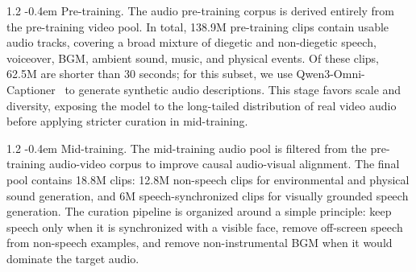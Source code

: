 \documentclass{llmxive}
\makeatletter
\providecommand{\paragraph}{  \@startsection{paragraph}{4}{\z@}    {1\baselineskip \@plus .2\baselineskip}    {-0.4em}    {\normalfont\normalsize\bfseries}}
\makeatother
\begin{document}
\paragraph{Pre-training.}
The audio pre-training corpus is derived entirely from the pre-training video pool. In total, 138.9M pre-training clips contain usable audio tracks, covering a broad mixture of diegetic and non-diegetic speech, voiceover, BGM, ambient sound, music, and physical events. Of these clips, 62.5M are shorter than 30 seconds; for this subset, we use Qwen3-Omni-Captioner~\citep{xu2025qwen3omni} to generate synthetic audio descriptions. This stage favors scale and diversity, exposing the model to the long-tailed distribution of real video audio before applying stricter curation in mid-training.

\paragraph{Mid-training.}
The mid-training audio pool is filtered from the pre-training audio-video corpus to improve causal audio-visual alignment. The final pool contains 18.8M clips: 12.8M non-speech clips for environmental and physical sound generation, and 6M speech-synchronized clips for visually grounded speech generation. The curation pipeline is organized around a simple principle: keep speech only when it is synchronized with a visible face, remove off-screen speech from non-speech examples, and remove non-instrumental BGM when it would dominate the target audio.
\end{document}

